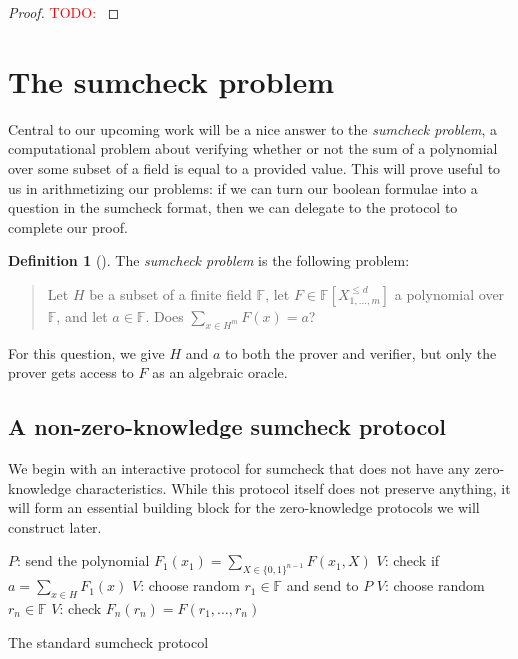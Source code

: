 \documentclass[english,12pt]{reedthesis}
\theoremstyle{plain}
\theoremstyle{definition}
\newtheorem{defn}[defn]{Definition}
\theoremstyle{remark}
\newcommand{\TODO}[1]{\textcolor{red}{TODO: #1}}
\begin{document}
\begin{proof}
  \TODO{}
\end{proof}

\section{The sumcheck problem}

Central to our upcoming work will be a nice answer to the \emph{sumcheck
  problem}, a computational problem about verifying whether or not the sum of a
polynomial over some subset of a field is equal to a provided value. This will
prove useful to us in arithmetizing our problems: if we can turn our boolean
formulae into a question in the sumcheck format, then we can delegate to the
protocol to complete our proof.

\begin{defn}[{\cite{LFKN92}}]\label{def:sumcheck}
  The \emph{sumcheck problem} is the following problem:
  \begin{quote}
    Let $H$ be a subset of a finite field $\mathbb{F}$, let
    $F \in \mathbb{F}[X_{1, \ldots, m}^{\le d}]$ a polynomial over $\mathbb{F}$, and let
    $a \in \mathbb{F}$. Does $\sum_{x \in H^{m}}F(x) = a$?
  \end{quote}
  For this question, we give $H$ and $a$ to both the prover and verifier, but
  only the prover gets access to $F$ as an algebraic oracle.
\end{defn}

\subsection{A non-zero-knowledge sumcheck protocol}

We begin with an interactive protocol for sumcheck that does not have any
zero-knowledge characteristics. While this protocol itself does not preserve
anything, it will form an essential building block for the zero-knowledge
protocols we will construct later.

\begin{algorithm}[htbp]
  $P$: send the polynomial $F_{1}(x_{1}) = \sum_{X \in \{0, 1\}^{n-1}}F(x_{1}, X)$\;
  $V$: check if $a = \sum_{x \in H}F_{1}(x)$\;
  $V$: choose random $r_{1} \in \mathbb{F}$ and send to $P$\;
  $V$: choose random $r_{n} \in \mathbb{F}$\;
  $V$: check $F_{n}(r_{n}) = F(r_{1}, \ldots, r_{n})$\;
  \caption{The standard sumcheck protocol~\cite[Thm.\ 1]{LFKN92}}\label{alg:sumcheck-std}
\end{algorithm}
\end{document}
